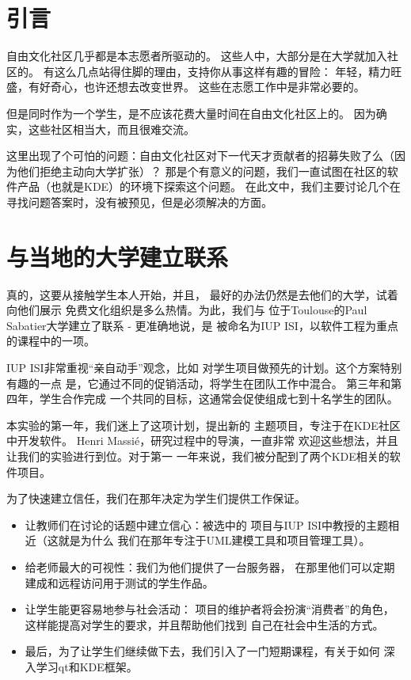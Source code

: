 

\section*{引言}
自由文化社区几乎都是本志愿者所驱动的。
这些人中，大部分是在大学就加入社区的。
有这么几点站得住脚的理由，支持你从事这样有趣的冒险：
年轻，精力旺盛，有好奇心，也许还想去改变世界。
这些在志愿工作中是非常必要的。

但是同时作为一个学生，是不应该花费大量时间在自由文化社区上的。
因为确实，这些社区相当大，而且很难交流。

这里出现了个可怕的问题：自由文化社区对下一代天才贡献者的招募失败了么（因为他们拒绝主动向大学扩张）？
那是个有意义的问题，我们一直试图在社区的软件产品（也就是KDE）的环境下探索这个问题。
在此文中，我们主要讨论几个在寻找问题答案时，没有被预见，但是必须解决的方面。

\section*{与当地的大学建立联系}
真的，这要从接触学生本人开始，并且，
最好的办法仍然是去他们的大学，试着向他们展示
免费文化组织是多么热情。为此，我们与
位于Toulouse的Paul Sabatier大学建立了联系 - 更准确地说，是
被命名为IUP ISI，以软件工程为重点的课程中的一项。

IUP ISI非常重视“亲自动手”观念，比如
对学生项目做预先的计划。这个方案特别有趣的一点
是，它通过不同的促销活动，将学生在团队工作中混合。
第三年和第四年，学生合作完成
一个共同的目标，这通常会促使组成七到十名学生的团队。

本实验的第一年，我们迷上了这项计划，提出新的
主题项目，专注于在KDE社区中开发软件。
Henri Massié，研究过程中的导演，一直非常
欢迎这些想法，并且让我们的实验进行到位。对于第一
一年来说，我们被分配到了两个KDE相关的软件项目。

为了快速建立信任，我们在那年决定为学生们提供工作保证。

\begin{itemize}
  \item 让教师们在讨论的话题中建立信心：被选中的
项目与IUP ISI中教授的主题相近（这就是为什么
我们在那年专注于UML建模工具和项目管理工具）。
  \item 给老师最大的可视性：我们为他们提供了一台服务器，
在那里他们可以定期建成和远程访问用于测试的学生作品。

  \item 让学生能更容易地参与社会活动：
项目的维护者将会扮演“消费者”的角色，
这样能提高对学生的要求，并且帮助他们找到
自己在社会中生活的方式。
  \item 最后，为了让学生们继续做下去，我们引入了一门短期课程，有关于如何
深入学习qt和KDE框架。
\end{itemize}

